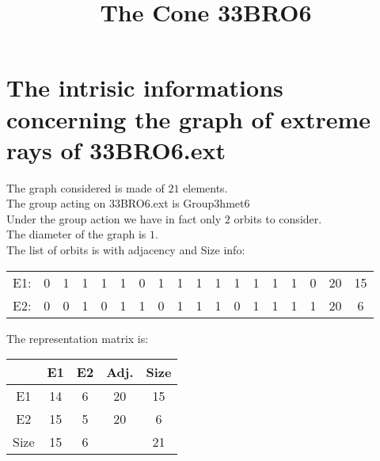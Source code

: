 \documentclass[12pt]{article}
\title{The Cone 33BRO6}
\begin{document}
\maketitle
\section{The intrisic informations concerning the graph of extreme rays of 33BRO6.ext}
The graph considered is made of $21$ elements.\\
The group acting on 33BRO6.ext is Group3hmet6\\
Under the group action we have in fact only $2$ orbits to consider.\\
The diameter of the graph is $1$.\\
The list of orbits is with adjacency and Size info:
\begin{center}
\scriptsize
\begin{tabular}{cccccccccccccccc|c|c}
E1:&0&1&1&1&1&0&1&1&1&1&1&1&1&1&0&20&15\\
E2:&0&0&1&0&1&1&0&1&1&1&0&1&1&1&1&20&6\\
\end{tabular}
\end{center}
The representation matrix is:
\begin{center}
\scriptsize
\begin{tabular}{|c|cc|c|c|}
\hline
&E1&E2&Adj.&Size\\
\hline
E1& 14& 6&20&15\\
E2& 15& 5&20&6\\
\hline
Size&15&6&&21\\
\hline
\end{tabular}
\end{center}
\end{document}
